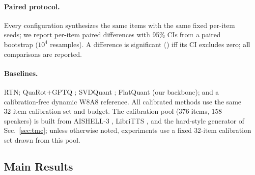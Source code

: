 \paragraph{Paired protocol.}
Every configuration synthesizes the same items with the same fixed per-item seeds; we report per-item paired differences with 95\% CIs from a paired bootstrap ($10^4$ resamples). A difference is significant (\sig) iff its CI excludes zero; all comparisons are reported.

\paragraph{Baselines.}
RTN; QuaRot$+$GPTQ \citep{ashkboos2024quarot,frantar2023gptq}; SVDQuant \citep{li2025svdquant}; FlatQuant \citep{sun2025flatquant} (our backbone); and a calibration-free dynamic W8A8 reference. All calibrated methods use the same 32-item calibration set and budget. The calibration pool (376 items, 158 speakers) is built from AISHELL-3 \citep{shi2021aishell3}, LibriTTS \citep{zen2019libritts}, and the hard-style generator of Sec.~\ref{sec:tmc}; unless otherwise noted, experiments use a fixed 32-item calibration set drawn from this pool.

\subsection{Main Results}
\label{sec:main}


